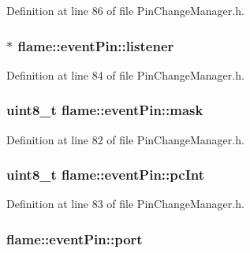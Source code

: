 Definition at line 86 of file Pin\-Change\-Manager.\-h.

\hypertarget{structflame_1_1event_pin_aa38718b7fe55c65f7e2917dc0bfc2f0c}{
\subsubsection[{listener}]{$\ast$ flame\-::event\-Pin\-::listener}}\label{structflame_1_1event_pin_aa38718b7fe55c65f7e2917dc0bfc2f0c}


Definition at line 84 of file Pin\-Change\-Manager.\-h.

\hypertarget{structflame_1_1event_pin_a2b66016381933ad3285bbcec8ce36257}{
\subsubsection[{mask}]{\setlength{\rightskip}{0pt plus 5cm}uint8\-\_\-t flame\-::event\-Pin\-::mask}}\label{structflame_1_1event_pin_a2b66016381933ad3285bbcec8ce36257}


Definition at line 82 of file Pin\-Change\-Manager.\-h.

\hypertarget{structflame_1_1event_pin_a61cbe32d1c708c62ab074935bef267ee}{
\subsubsection[{pc\-Int}]{\setlength{\rightskip}{0pt plus 5cm}uint8\-\_\-t flame\-::event\-Pin\-::pc\-Int}}\label{structflame_1_1event_pin_a61cbe32d1c708c62ab074935bef267ee}


Definition at line 83 of file Pin\-Change\-Manager.\-h.

\hypertarget{structflame_1_1event_pin_a7bfb98722a6a21d33c3c262c6a847382}{
\subsubsection[{port}]{ flame\-::event\-Pin\-::port}}\label{structflame_1_1event_pin_a7bfb98722a6a21d33c3c262c6a847382}


